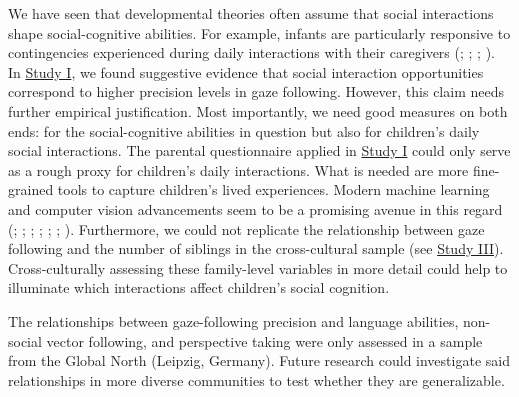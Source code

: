 \documentclass[
]{scrbook}
\begin{document}
We have seen that developmental theories often assume that social interactions shape social-cognitive abilities. For example, infants are particularly responsive to contingencies experienced during daily interactions with their caregivers (; ; ; ). In \hyperref[studyI]{Study I}, we found suggestive evidence that social interaction opportunities correspond to higher precision levels in gaze following. However, this claim needs further empirical justification. Most importantly, we need good measures on both ends: for the social-cognitive abilities in question but also for children's daily social interactions. The parental questionnaire applied in \hyperref[studyI]{Study I} could only serve as a rough proxy for children's daily interactions. What is needed are more fine-grained tools to capture children's lived experiences. Modern machine learning and computer vision advancements seem to be a promising avenue in this regard (; ; ; ; ; ; ). Furthermore, we could not replicate the relationship between gaze following and the number of siblings in the cross-cultural sample (see \hyperref[studyIII]{Study III}). Cross-culturally assessing these family-level variables in more detail could help to illuminate which interactions affect children's social cognition.

The relationships between gaze-following precision and language abilities, non-social vector following, and perspective taking were only assessed in a sample from the Global North (Leipzig, Germany). Future research could investigate said relationships in more diverse communities to test whether they are generalizable.
\end{document}
